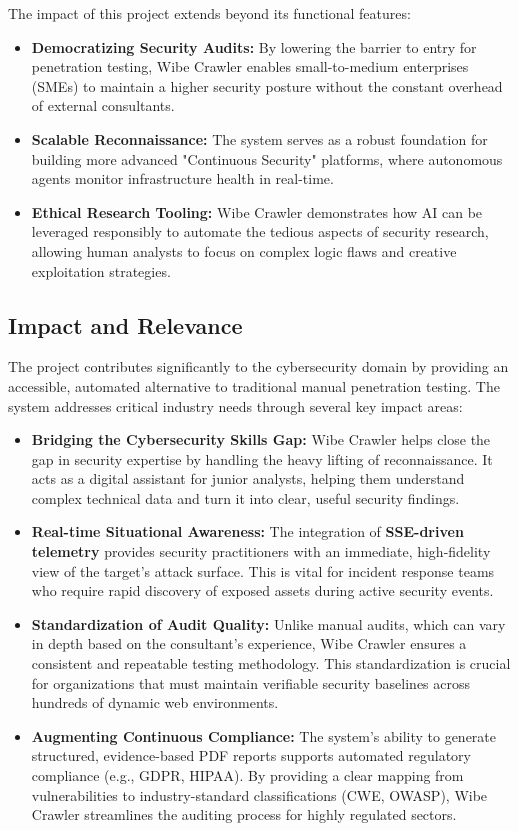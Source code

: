 \documentclass[12pt,oneside,a4paper]{book}
\begin{document}
The impact of this project extends beyond its functional features:
\begin{itemize}
    \item \textbf{Democratizing Security Audits:} By lowering the barrier to entry for penetration testing, Wibe Crawler enables small-to-medium enterprises (SMEs) to maintain a higher security posture without the constant overhead of external consultants.
    \item \textbf{Scalable Reconnaissance:} The system serves as a robust foundation for building more advanced "Continuous Security" platforms, where autonomous agents monitor infrastructure health in real-time.
    \item \textbf{Ethical Research Tooling:} Wibe Crawler demonstrates how AI can be leveraged responsibly to automate the tedious aspects of security research, allowing human analysts to focus on complex logic flaws and creative exploitation strategies.
\end{itemize}

\subsection{Impact and Relevance}

The project contributes significantly to the cybersecurity domain by providing an accessible, automated alternative to traditional manual penetration testing. The system addresses critical industry needs through several key impact areas:

\begin{itemize}
    \item \textbf{Bridging the Cybersecurity Skills Gap:} Wibe Crawler helps close the gap in security expertise by handling the heavy lifting of reconnaissance. It acts as a digital assistant for junior analysts, helping them understand complex technical data and turn it into clear, useful security findings.
    \item \textbf{Real-time Situational Awareness:} The integration of \textbf{SSE-driven telemetry} provides security practitioners with an immediate, high-fidelity view of the target's attack surface. This is vital for incident response teams who require rapid discovery of exposed assets during active security events.
    \item \textbf{Standardization of Audit Quality:} Unlike manual audits, which can vary in depth based on the consultant's experience, Wibe Crawler ensures a consistent and repeatable testing methodology. This standardization is crucial for organizations that must maintain verifiable security baselines across hundreds of dynamic web environments.
    \item \textbf{Augmenting Continuous Compliance:} The system's ability to generate structured, evidence-based PDF reports supports automated regulatory compliance (e.g., GDPR, HIPAA). By providing a clear mapping from vulnerabilities to industry-standard classifications (CWE, OWASP), Wibe Crawler streamlines the auditing process for highly regulated sectors.
\end{itemize}
\end{document}
